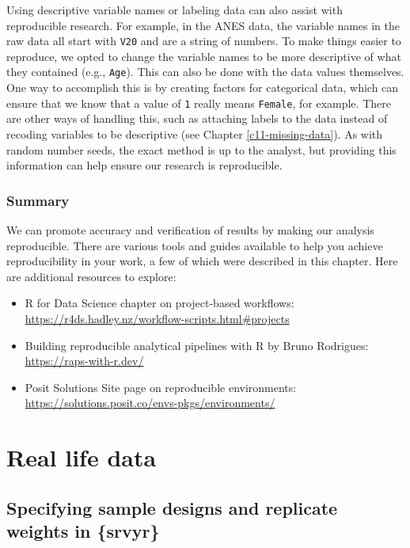 \documentclass[
]{krantz}
\providecommand{\tightlist}{%
  \setlength{\itemsep}{0pt}\setlength{\parskip}{0pt}}
\begin{document}
Using descriptive variable names or labeling data can also assist with reproducible research. For example, in the ANES data, the variable names in the raw data all start with \texttt{V20} and are a string of numbers. To make things easier to reproduce, we opted to change the variable names to be more descriptive of what they contained (e.g., \texttt{Age}). This can also be done with the data values themselves. One way to accomplish this is by creating factors for categorical data, which can ensure that we know that a value of \texttt{1} really means \texttt{Female}, for example. There are other ways of handling this, such as attaching labels to the data instead of recoding variables to be descriptive (see Chapter \ref{c11-missing-data}). As with random number seeds, the exact method is up to the analyst, but providing this information can help ensure our research is reproducible.

\hypertarget{summary}{%
\section{Summary}\label{summary}}

We can promote accuracy and verification of results by making our analysis reproducible. There are various tools and guides available to help you achieve reproducibility in your work, a few of which were described in this chapter. Here are additional resources to explore:

\begin{itemize}
\tightlist
\item
  R for Data Science chapter on project-based workflows: \url{https://r4ds.hadley.nz/workflow-scripts.html\#projects}
\item
  Building reproducible analytical pipelines with R by Bruno Rodrigues: \url{https://raps-with-r.dev/}
\item
  Posit Solutions Site page on reproducible environments: \url{https://solutions.posit.co/envs-pkgs/environments/}
\end{itemize}

\hypertarget{part-real-life-data}{%
\part{Real life data}\label{part-real-life-data}}

\hypertarget{c10-specifying-sample-designs}{%
\chapter{Specifying sample designs and replicate weights in \{srvyr\}}\label{c10-specifying-sample-designs}}
\end{document}
